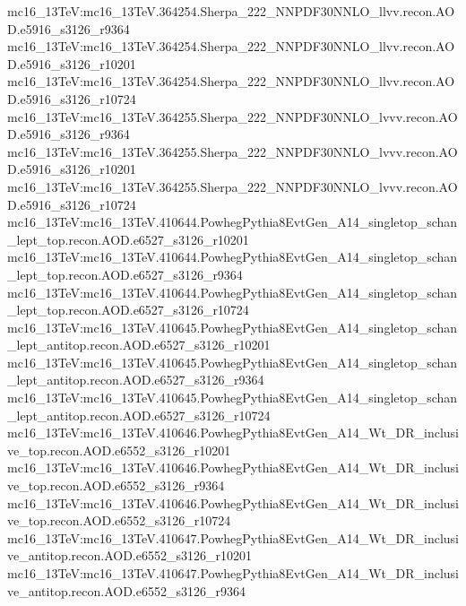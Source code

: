 { mc16\_13TeV:mc16\_13TeV.364254.Sherpa\_222\_NNPDF30NNLO\_llvv.recon.AOD.e5916\_s3126\_r9364\newline    
 mc16\_13TeV:mc16\_13TeV.364254.Sherpa\_222\_NNPDF30NNLO\_llvv.recon.AOD.e5916\_s3126\_r10201\newline    
 mc16\_13TeV:mc16\_13TeV.364254.Sherpa\_222\_NNPDF30NNLO\_llvv.recon.AOD.e5916\_s3126\_r10724\newline    
 mc16\_13TeV:mc16\_13TeV.364255.Sherpa\_222\_NNPDF30NNLO\_lvvv.recon.AOD.e5916\_s3126\_r9364\newline    
 mc16\_13TeV:mc16\_13TeV.364255.Sherpa\_222\_NNPDF30NNLO\_lvvv.recon.AOD.e5916\_s3126\_r10201\newline    
 mc16\_13TeV:mc16\_13TeV.364255.Sherpa\_222\_NNPDF30NNLO\_lvvv.recon.AOD.e5916\_s3126\_r10724\newline    
 mc16\_13TeV:mc16\_13TeV.410644.PowhegPythia8EvtGen\_A14\_singletop\_schan\_lept\_top.recon.AOD.e6527\_s3126\_r10201\newline    
 mc16\_13TeV:mc16\_13TeV.410644.PowhegPythia8EvtGen\_A14\_singletop\_schan\_lept\_top.recon.AOD.e6527\_s3126\_r9364\newline    
 mc16\_13TeV:mc16\_13TeV.410644.PowhegPythia8EvtGen\_A14\_singletop\_schan\_lept\_top.recon.AOD.e6527\_s3126\_r10724\newline    
 mc16\_13TeV:mc16\_13TeV.410645.PowhegPythia8EvtGen\_A14\_singletop\_schan\_lept\_antitop.recon.AOD.e6527\_s3126\_r10201\newline    
 mc16\_13TeV:mc16\_13TeV.410645.PowhegPythia8EvtGen\_A14\_singletop\_schan\_lept\_antitop.recon.AOD.e6527\_s3126\_r9364\newline    
 mc16\_13TeV:mc16\_13TeV.410645.PowhegPythia8EvtGen\_A14\_singletop\_schan\_lept\_antitop.recon.AOD.e6527\_s3126\_r10724\newline   
 mc16\_13TeV:mc16\_13TeV.410646.PowhegPythia8EvtGen\_A14\_Wt\_DR\_inclusive\_top.recon.AOD.e6552\_s3126\_r10201\newline    
 mc16\_13TeV:mc16\_13TeV.410646.PowhegPythia8EvtGen\_A14\_Wt\_DR\_inclusive\_top.recon.AOD.e6552\_s3126\_r9364\newline    
 mc16\_13TeV:mc16\_13TeV.410646.PowhegPythia8EvtGen\_A14\_Wt\_DR\_inclusive\_top.recon.AOD.e6552\_s3126\_r10724\newline    
 mc16\_13TeV:mc16\_13TeV.410647.PowhegPythia8EvtGen\_A14\_Wt\_DR\_inclusive\_antitop.recon.AOD.e6552\_s3126\_r10201\newline    
 mc16\_13TeV:mc16\_13TeV.410647.PowhegPythia8EvtGen\_A14\_Wt\_DR\_inclusive\_antitop.recon.AOD.e6552\_s3126\_r9364   \newline 
}
